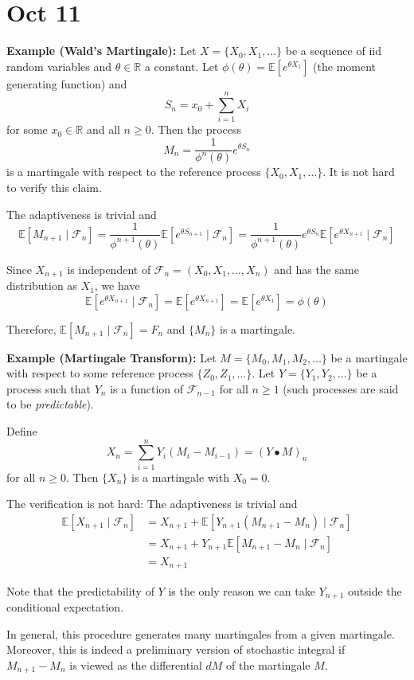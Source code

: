 \documentclass[12pt]{report}
\newcommand{\F}{\mathcal{F}}
\newcommand{\R}{\mathbb{R}}
\newcommand{\E}{\mathbb{E}}
\begin{document}
\section{Oct 11}
    \textbf{Example (Wald's Martingale):} Let $X = \{X_0, X_1, \dots\}$ be a sequence of iid random variables and $\theta \in \R$ a constant. Let $\phi(\theta) = \E[e^{\theta X_1}]$ (the moment generating function) and 
    \[S_n = x_0 + \sum_{i=1}^{n} X_i \]
    for some $x_0 \in \R$ and all $n \geq 0$. Then the process 
    \[M_n = \frac{1}{\phi^n(\theta)} e^{\theta S_n}\]
    is a martingale with respect to the reference process $\{X_0, X_1, \dots\}$. It is not hard to verify this claim. 

    The adaptiveness is trivial and 
    \[\E[M_{n+1} \; | \; \F_n] = \frac{1}{\phi^{n+1}(\theta)} \E[e^{\theta S_{n+1}} \; | \; \F_n] = \frac{1}{\phi^{n+1}(\theta)} e^{\theta S_n} \E[e^{\theta X_{n+1}} \; | \; \F_n]\]

    Since $X_{n+1}$ is independent of $\F_n = (X_0, X_1, \dots, X_n)$ and has the same distribution as $X_1$, we have 
    \[\E[e^{\theta X_{n+1}} \; | \; \F_n] = \E[e^{\theta X_{n+1}}] = \E[e^{\theta X_1}] = \phi(\theta)\]

    Therefore, $\E[M_{n+1} \; | \; \F_n] = F_n$ and $\{M_n\}$ is a martingale. 

    \textbf{Example (Martingale Transform):} Let $M = \{M_0, M_1, M_2, \dots\}$ be a martingale with respect to some reference process $\{Z_0, Z_1, \dots\}$. Let $Y = \{Y_1, Y_2, \dots\}$ be a process such that $Y_n$ is a function of $\F_{n-1}$ for all $n \geq 1$ (such processes are said to be \emph{predictable}). 

    Define 
    \[X_n = \sum_{i=1}^{n} Y_i(M_i - M_{i-1}) = (Y \bullet M)_n \]
    for all $n\geq 0$. Then $\{X_n\}$ is a martingale with $X_0 = 0$. 

    The verification is not hard: The adaptiveness is trivial and 
    \begin{align*}
        \E[X_{n+1} \; | \; \F_n] &= X_{n+1} + \E[Y_{n+1}(M_{n+1} - M_n) \; | \; \F_n]\\
        &= X_{n+1} + Y_{n+1} \E[M_{n+1} - M_n \; | \; \F_n]\\
        &= X_{n+1}
    \end{align*}

    Note that the predictability of $Y$ is the only reason we can take $Y_{n+1}$ outside the conditional expectation. 

    In general, this procedure generates many martingales from a given martingale. Moreover, this is indeed a preliminary version of stochastic integral if $M_{n+1} - M_n$ is viewed as the differential $dM$ of the martingale $M$.
\end{document}
